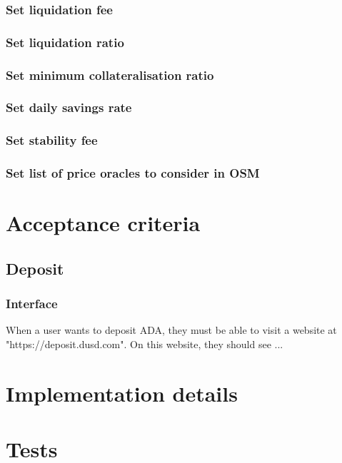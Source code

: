 \documentclass{article} %
\begin{document}
\subsubsection{Set liquidation fee}

\subsubsection{Set liquidation ratio}

\subsubsection{Set minimum collateralisation ratio}

\subsubsection{Set daily savings rate}

\subsubsection{Set stability fee}

\subsubsection{Set list of price oracles to consider in OSM}


\section{Acceptance criteria}

\subsection{Deposit}

\subsubsection{Interface}

When a user wants to deposit ADA, they must be able to visit a website at "https://deposit.dusd.com".
On this website, they should see ...

\section{Implementation details}

\section{Tests}
\end{document}
